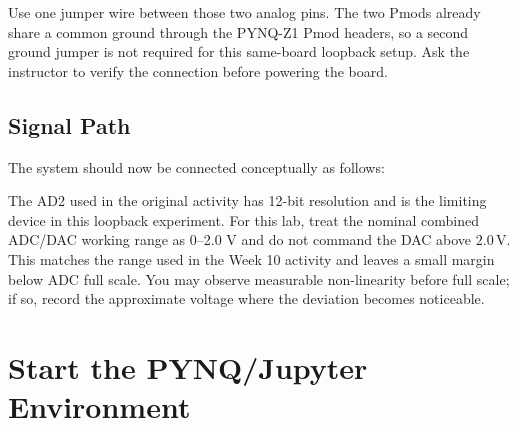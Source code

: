 \documentclass[11pt]{article}
\begin{document}
Use one jumper wire between those two analog pins. The two Pmods already share a common ground through the PYNQ-Z1 Pmod headers, so a second ground jumper is not required for this same-board loopback setup.  Ask the instructor to verify the connection before powering the board.

\subsection{Signal Path}

The system should now be connected conceptually as follows:

\begin{center}
\end{center}

The AD2 used in the original activity has 12-bit resolution and is the limiting device in this loopback experiment. For this lab, treat the nominal combined ADC/DAC working range as 0--2.0 V and do not command the DAC above $2.0\,$V. This matches the range used in the Week 10 activity and leaves a small margin below ADC full scale. You may observe measurable non-linearity before full scale; if so, record the approximate voltage where the deviation becomes noticeable.

\begin{center}
\end{center}

\section{Start the PYNQ/Jupyter Environment}
\end{document}
